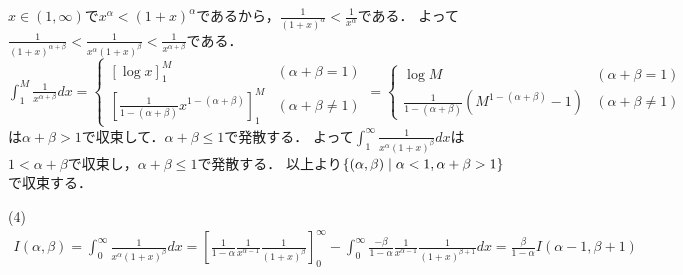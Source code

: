 \documentclass[
		book,
		head_space=20mm,
		foot_space=20mm,
		gutter=10mm,
		line_length=190mm
]{jlreq}
\begin{document}
$x\in(1,\infty)$で$x^\alpha<(1+x)^\alpha$であるから，$\frac{1}{(1+x)^\alpha}<\frac{1}{x^\alpha}$である．
よって$\frac{1}{(1+x)^{\alpha+\beta}}<\frac{1}{x^\alpha(1+x)^\beta}<\frac{1}{x^{\alpha+\beta}}$である．
$\int_1^M \frac{1}{x^{\alpha+\beta}}dx=\begin{cases}
	[\log x]_1^M& (\alpha+\beta=1)\\
	[\frac{1}{1-(\alpha+\beta)}x^{1-(\alpha+\beta)}]_1^M&(\alpha+\beta\neq 1)
\end{cases}=\begin{cases}
	\log M& (\alpha+\beta=1)\\
	\frac{1}{1-(\alpha+\beta)}(M^{1-(\alpha+\beta)}-1)&(\alpha+\beta\neq 1)
\end{cases}$は$\alpha+\beta>1$で収束して．$\alpha+\beta\le 1$で発散する．
よって$\int_1^\infty\frac{1}{x^\alpha(1+x)^\beta}dx$は$1<\alpha+\beta$で収束し，$\alpha+\beta\le 1$で発散する．
以上より$\left\{ (\alpha,\beta)\mathrel{}\middle|\mathrel{} \alpha<1,\alpha+\beta>1\right\}$で収束する．

(4)\begin{align}
	I(\alpha,\beta)=\int_{0}^\infty \frac{1}{x^\alpha(1+x)^\beta}dx=\left[ \frac{1}{1-\alpha}\frac{1}{x^{\alpha-1}}\frac{1}{(1+x)^\beta} \right]_0^\infty-\int_0^\infty  \frac{-\beta}{1-\alpha}\frac{1}{x^{\alpha-1}}\frac{1}{(1+x)^{\beta+1}}dx=\frac{\beta}{1-\alpha}I(\alpha-1,\beta+1)
\end{align}
\end{document}
